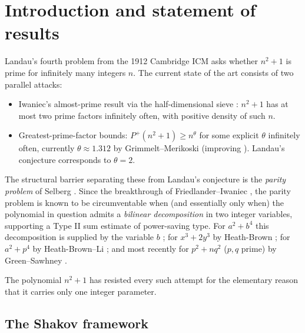 \documentclass[11pt]{article}
\theoremstyle{definition}
\begin{document}
\section{Introduction and statement of results}\label{sec:intro}

Landau's fourth problem from the 1912 Cambridge ICM asks whether
$n^{2}+1$ is prime for infinitely many integers $n$. The current state of
the art consists of two parallel attacks:
\begin{itemize}
\item Iwaniec's almost-prime result \cite{iwaniec78} via the
half-dimensional sieve \cite{iwaniec76}: $n^{2}+1$ has at most two prime
factors infinitely often, with positive density of such $n$.
\item Greatest-prime-factor bounds: $P^{+}(n^{2}+1)\ge n^{\theta}$ for some
explicit $\theta$ infinitely often, currently $\theta\approx1.312$ by
Grimmelt--Merikoski \cite{grimmelt-merikoski25} (improving
\cite{merikoski22,pascadi24}). Landau's conjecture corresponds to
$\theta=2$.
\end{itemize}

The structural barrier separating these from Landau's conjecture is the
\emph{parity problem} of Selberg \cite{selberg-collected,heath-brown82}.
Since the breakthrough of Friedlander--Iwaniec \cite{FI98a,FI98b}, the
parity problem is known to be circumventable when (and essentially only
when) the polynomial in question admits a \emph{bilinear decomposition}
in two integer variables, supporting a Type II sum estimate of
power-saving type. For $a^{2}+b^{4}$ this decomposition is supplied by
the variable $b$ \cite{FI98b}; for $x^{3}+2y^{3}$ by Heath-Brown
\cite{HB01}; for $a^{2}+p^{4}$ by Heath-Brown--Li \cite{HB-Li15}; and most
recently for $p^{2}+nq^{2}$ ($p,q$ prime) by Green--Sawhney
\cite{green-sawhney24}.

The polynomial $n^{2}+1$ has resisted every such attempt for the
elementary reason that it carries only one integer parameter.

\subsection{The Shakov framework}\label{ss:shakov-framework}
\end{document}
